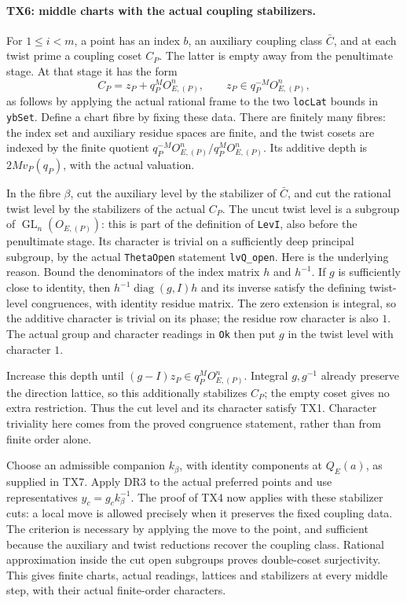 \paragraph{TX6: middle charts with the actual coupling stabilizers.}
For \(1\le i<m\), a point has an index \(b\), an auxiliary coupling
class \(\bar C\), and at each twist prime a coupling coset \(C_P\).
The latter is empty away from the penultimate stage. At that stage
it has the form
\[
 C_P=z_P+q_P^{M}O_{E,(P)}^n,
 \qquad z_P\in q_P^{-M}O_{E,(P)}^n,
\]
as follows by applying the actual rational frame to the two
\texttt{locLat} bounds in \texttt{ybSet}. Define a chart fibre by
fixing these data. There are finitely many fibres: the index set and
auxiliary residue spaces are finite, and the twist cosets are indexed
by the finite quotient
\(q_P^{-M}O_{E,(P)}^n/q_P^{M}O_{E,(P)}^n\).
Its additive depth is \(2M v_P(q_P)\), with the actual valuation.

In the fibre \(\beta\), cut the auxiliary level by the stabilizer
of \(\bar C\), and cut the rational twist level by the stabilizers
of the actual \(C_P\). The uncut twist level is a subgroup of
\(\operatorname{GL}_n(O_{E,(P)})\): this is part of the definition
of \texttt{LevI}, also before the penultimate stage. Its character
is trivial on a sufficiently deep principal subgroup, by the actual
\texttt{ThetaOpen} statement \texttt{lvQ\_open}. Here is the
underlying reason. Bound the denominators of the index matrix
\(h\) and \(h^{-1}\). If \(g\) is sufficiently close to identity,
then \(h^{-1}\operatorname{diag}(g,I)h\) and its inverse satisfy
the defining twist-level congruences, with identity residue matrix.
The zero extension is integral, so the additive character is trivial
on its phase; the residue row character is also \(1\).
The actual group and character readings in \texttt{Ok} then put
\(g\) in the twist level with character \(1\).

Increase this depth until
\((g-I)z_P\in q_P^{M}O_{E,(P)}^n\).
Integral \(g,g^{-1}\) already preserve the direction lattice, so
this additionally stabilizes \(C_P\); the empty coset gives no
extra restriction. Thus the cut level and its character satisfy
TX1. Character triviality here comes from the proved congruence
statement, rather than from finite order alone.

Choose an admissible companion \(k_\beta\), with identity components
at \(Q_E(a)\), as supplied in TX7. Apply DR3 to the actual preferred
points and use representatives \(y_c=g_c k_\beta^{-1}\).
The proof of TX4 now applies with these stabilizer cuts: a local
move is allowed precisely when it preserves the fixed coupling
data. The criterion is necessary by applying the move to the
point, and sufficient because the auxiliary and twist reductions
recover the coupling class. Rational approximation inside the
cut open subgroups proves double-coset surjectivity. This gives
finite charts, actual readings, lattices and stabilizers at every
middle step, with their actual finite-order characters.

